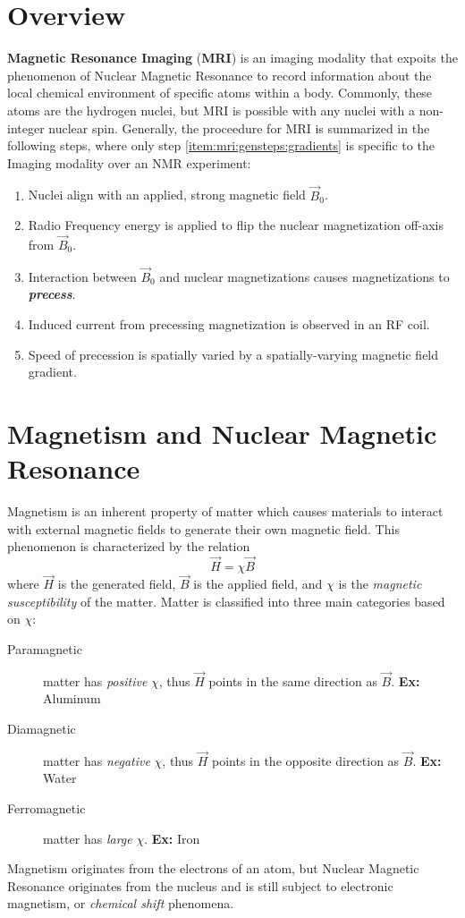 \section{Overview} 
\textbf{Magnetic Resonance Imaging} (\textbf{MRI}) is an imaging modality that expoits the phenomenon of Nuclear Magnetic Resonance to record information about the local chemical environment of specific atoms within a body. Commonly, these atoms are the hydrogen nuclei, but MRI is possible with any nuclei with a non-integer nuclear spin. Generally, the proceedure for MRI is summarized in the following steps, where only step \ref{item:mri:gensteps:gradients} is specific to the Imaging modality over an NMR experiment:
\begin{enumerate}
	\item \label{item:mri:gensteps:b0} Nuclei align with an applied, strong magnetic field $\vec{B}_0$.
	\item \label{item:mri:gensteps:rf} Radio Frequency energy is applied to flip the nuclear magnetization off-axis from $\vec{B}_0$.
	\item \label{item:mri:gensteps:precess} Interaction between $\vec{B}_0$ and nuclear magnetizations causes magnetizations to \textbf{\textit{precess}}.
	\item \label{item:mri:gensteps:record} Induced current from precessing magnetization is observed in an RF coil.
	\item \label{item:mri:gensteps:gradients} Speed of precession is spatially varied by a spatially-varying magnetic field gradient.
\end{enumerate}
\section{Magnetism and Nuclear Magnetic Resonance}
Magnetism is an inherent property of matter which causes materials to interact with external magnetic fields to generate their own magnetic field. This phenomenon is characterized by the relation
\begin{equation}
\vec{H} = \chi \vec{B} \label{eq:mri:magneticsusceptibility}
\end{equation}
where $\vec{H}$ is the generated field, $\vec{B}$ is the applied field, and $\chi$ is the \textit{magnetic susceptibility} of the matter. Matter is classified into three main categories based on $\chi$:
\begin{description}
	\item[Paramagnetic] matter has \textit{positive} $\chi$, thus $\vec{H}$ points in the same direction as $\vec{B}$. \textbf{Ex:} Aluminum
	\item[Diamagnetic] matter has \textit{negative} $\chi$, thus $\vec{H}$ points in the opposite direction as $\vec{B}$. \textbf{Ex:} Water
	\item[Ferromagnetic] matter has \textit{large} $\chi$. \textbf{Ex:} Iron
\end{description}
Magnetism originates from the electrons of an atom, but Nuclear Magnetic Resonance originates from the nucleus and is still subject to electronic magnetism, or \textit{chemical shift} phenomena.

